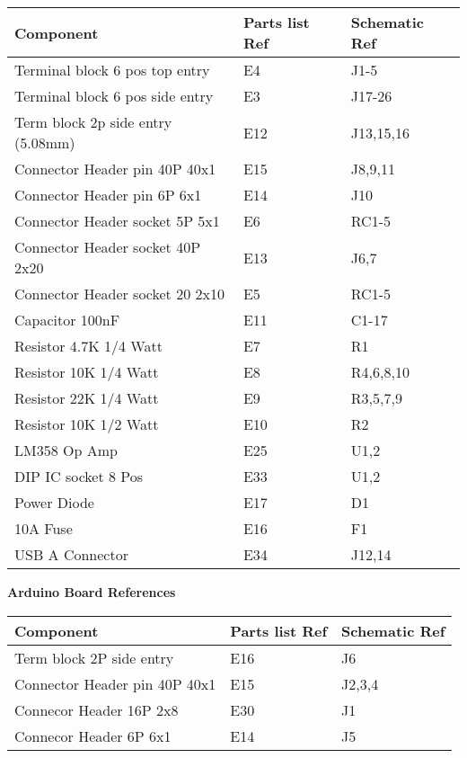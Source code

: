 \documentclass[12pt]{article}
\begin{document}
\begin{table}[H]
	\centering
	\begin{tabular}{| l | l | l | }
		\hline 
		\textbf{Component} & \textbf{Parts list Ref} & \textbf{Schematic Ref} \\ \hline
		Terminal block 6 pos top entry  & E4 & J1-5 \\ \hline
		Terminal block 6 pos side entry & E3 & J17-26 \\ \hline
		Term block 2p side entry (5.08mm) & E12 & J13,15,16 \\ \hline
		Connector Header pin 40P 40x1 & E15 & J8,9,11 \\ \hline
		Connector Header pin 6P 6x1 & E14 & J10 \\ \hline
		Connector Header socket 5P 5x1 & E6 & RC1-5 \\ \hline
		Connector Header socket 40P 2x20 & E13 & J6,7 \\ \hline
		Connector Header socket 20 2x10 & E5 & RC1-5 \\ \hline
		Capacitor 100nF & E11 & C1-17 \\ \hline
		Resistor 4.7K 1/4 Watt  & E7 & R1 \\ \hline
		Resistor 10K 1/4 Watt & E8 & R4,6,8,10 \\ \hline
		Resistor 22K 1/4 Watt & E9 & R3,5,7,9 \\ \hline
		Resistor 10K 1/2 Watt & E10 & R2 \\ \hline
		LM358 Op Amp & E25 & U1,2 \\ \hline
		DIP IC socket 8 Pos & E33 & U1,2 \\ \hline
		Power Diode & E17 & D1 \\ \hline
		10A Fuse & E16 & F1 \\ \hline
		USB A Connector & E34 & J12,14 \\ \hline

	\end{tabular}
\end{table}

\bigskip 
\begin{frame}{}
  \centering \Huge
  \textbf{Arduino Board References}
\end{frame}

\begin{table}[H]
	\centering
	\begin{tabular}{| l | l | l | }
		\hline 
		\textbf{Component} & \textbf{Parts list Ref} & \textbf{Schematic Ref} \\ \hline
		Term block 2P side entry & E16 & J6 \\ \hline
		Connector Header pin 40P 40x1 & E15 & J2,3,4 \\ \hline
		Connecor Header 16P 2x8 & E30 & J1 \\ \hline
		Connecor Header 6P 6x1 & E14 & J5 \\ \hline 

	\end{tabular}
\end{table}
\end{document}
